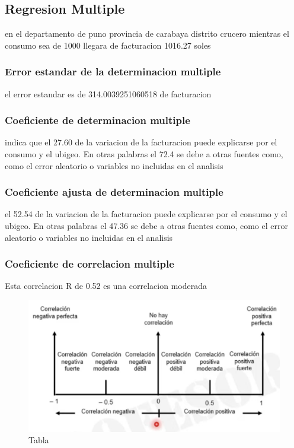 \documentclass{article}
\begin{document}
\subsection{Regresion Multiple}


en el departamento de puno provincia de carabaya distrito crucero mientras el consumo sea de 1000 llegara de facturacion 1016.27 soles

\subsubsection{Error estandar de la determinacion multiple}
el error estandar es de 314.0039251060518 de facturacion

\subsubsection{Coeficiente de determinacion multiple}
indica que el 27.60 de la variacion de la facturacion puede explicarse por el consumo y el ubigeo. En otras palabras el 72.4 se debe a otras fuentes como, como el error aleatorio o variables no incluidas en el analisis
\subsubsection{Coeficiente ajusta de determinacion multiple}
el 52.54 de la variacion de la facturacion puede explicarse por el consumo y el ubigeo. En otras palabras el 47.36 se debe a otras fuentes como, como el error aleatorio o variables no incluidas en el analisis
\subsubsection{Coeficiente de correlacion multiple}
Esta correlacion R de 0.52 es una correlacion moderada

\begin{figure}[H]
  \centering
  \includegraphics[width=1\textwidth]{./img/correlacion.png}
  \caption{Tabla}
  \label{Tabla}
\end{figure}
\end{document}
